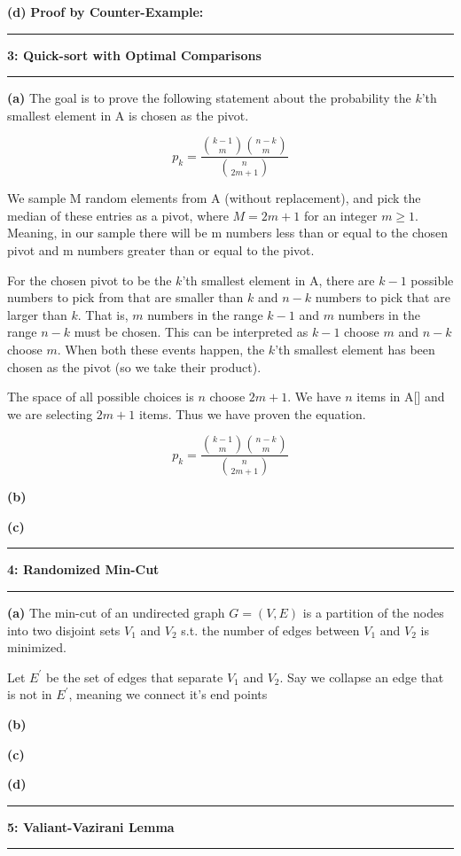 \documentclass[11pt]{article}
\newcommand\question[2]{\vspace{.25in}\hrule\textbf{#1: #2}\vspace{.5em}\hrule\vspace{.10in}}
\renewcommand\part[1]{\vspace{.10in}\textbf{(#1)}}
\begin{document}
\part{d} \textbf{Proof by Counter-Example:} 

\question{3}{Quick-sort with Optimal Comparisons}

\part{a} The goal is to prove the following statement about the probability the $k$'th smallest element in A is chosen as the pivot.

$$p_k = \frac{{k-1 \choose m} {n-k \choose m}}{{n \choose 2m+1}}$$ 

We sample M random elements from A (without replacement), and pick the median of these entries as a pivot, where $M = 2m + 1$ for an integer $m \geq 1$. Meaning, in our sample there will be m numbers less than or equal to the chosen pivot and m numbers greater than or equal to the pivot. 

For the chosen pivot to be the $k$'th smallest element in A, there are $k - 1$ possible numbers to pick from that are smaller than $k$ and $n - k$ numbers to pick that are larger than $k$. That is, $m$ numbers in the range $k - 1$ and $m$ numbers in the range $n - k$ must be chosen. This can be interpreted as $k - 1$ choose $m$ and $n - k$ choose $m$. When both these events happen, the $k$'th smallest element has been chosen as the pivot (so we take their product). 

The space of all possible choices is $n$ choose $2m + 1$. We have $n$ items in A[] and we are selecting $2m + 1$ items. Thus we have proven the equation.


$$p_k = \frac{{k-1 \choose m} {n-k \choose m}}{{n \choose 2m+1}}$$ 

\part{b}

\part{c}

\question{4}{Randomized Min-Cut}

\part{a} The min-cut of an undirected graph $G = (V, E)$ is a partition of the nodes into two disjoint sets $V_1$ and $V_2$ s.t. the number of edges between $V_1$ and $V_2$ is minimized.

Let $E^\prime$ be the set of edges that separate $V_1$ and $V_2$. Say we collapse an edge that is not in $E^\prime$, meaning we connect it's end points

\part{b}

\part{c}

\part{d}

\question{5}{Valiant-Vazirani Lemma}
\end{document}
